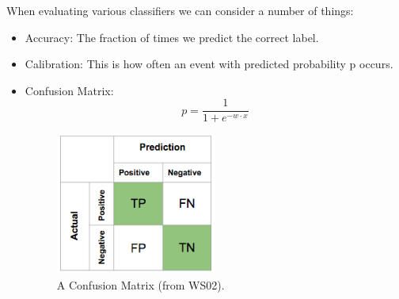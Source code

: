When evaluating various classifiers we can consider a number of things:
\begin{itemize}
\item Accuracy: The fraction of times we predict the correct label.
\item Calibration: This is how often an event with predicted probability p occurs.
\item Confusion Matrix:
\begin{equation}
p = \frac{1}{1+e^{-w\cdot x}}
\end{equation}
\begin{figure}[ht]
  \begin{center}
    \includegraphics[width=0.5\textwidth]{figures/pic2.png}
    \caption{
      A Confusion Matrix (from WS02). 
      }
    \label{fig:example_figure}
  \end{center}
\end{figure}




\end{itemize}


